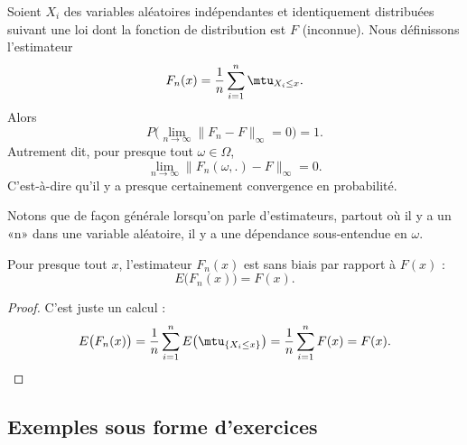 \begin{theorem}  \label{ThoXAEMbTI}
    Soient \( X_i\) des variables aléatoires indépendantes et identiquement distribuées suivant une loi dont la fonction de distribution est \( F\) (inconnue). Nous définissons l'estimateur
    \begin{equation}    \label{EqMQNRVcT}
        F_n(x)=\frac{1}{ n }\sum_{i=1}^n\mtu_{X_i\leq x}.
    \end{equation}
    Alors
    \begin{equation}
        P\big( \lim_{n\to \infty} \| F_n-F \|_{\infty}=0 \big)=1.
    \end{equation}
    Autrement dit, pour presque tout \( \omega \in \Omega\),
    \begin{equation}
        \lim_{n\to \infty} \| F_n(\omega,.)-F \|_{\infty}=0.
    \end{equation}
    C'est-à-dire qu'il y a presque certainement convergence en probabilité.
\end{theorem}
Notons que de façon générale lorsqu'on parle d'estimateurs, partout où il y a un «n» dans une variable aléatoire, il y a une dépendance sous-entendue en \( \omega\).

\begin{proposition} \label{PropHSHFbEq}
    Pour presque tout \( x\), l'estimateur \( F_n(x)\) est sans biais par rapport à \( F(x)\) :
    \begin{equation}
        E\big( F_n(x) \big)=F(x).
    \end{equation}
\end{proposition}

\begin{proof}
    C'est juste un calcul :
    \begin{equation}
        E\big( F_n(x) \big)=\frac{1}{ n }\sum_{i=1}^nE\big( \mtu_{\{ X_i\leq x \}} \big)=\frac{1}{n }\sum_{i=1}^nF(x)=F(x).
    \end{equation}
\end{proof}


\subsection{Exemples sous forme d'exercices}


